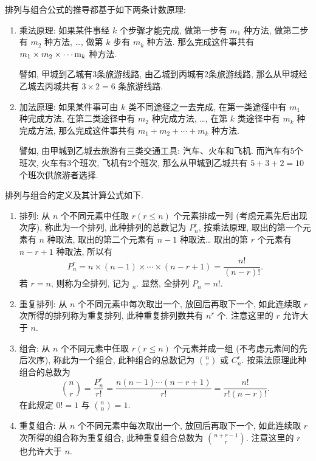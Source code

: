 排列与组合公式的推导都基于如下两条计数原理:
\begin{enumerate}
  \item 乘法原理:
  如果某件事经 $k$ 个步骤才能完成,
  做第一步有 $m_1$ 种方法,
  做第二步有 $m_2$ 种方法,
  \dots,
  做第 $k$ 步有 $m_k$ 种方法.
  那么完成这件事共有 $m_1 \times m_2 \times \dotsb \m_k$ 种方法.

  譬如,
  甲城到乙城有3条旅游线路,
  由乙城到丙城有2条旅游线路,
  那么从甲城经乙城去丙城共有 $3 \times 2 = 6$ 条旅游线路.

  \item 加法原理:
  如果某件事可由 $k$ 类不同途径之一去完成,
  在第一类途径中有 $m_1$ 种完成方法,
  在第二类途径中有 $m_2$ 种完成方法,
  \dots,
  在第 $k$ 类途径中有 $m_k$ 种完成方法,
  那么完成这件事共有 $m_1 + m_2 + \dotsb + m_k$ 种方法.

  譬如,
  由甲城到乙城去旅游有三类交通工具:
  汽车、火车和飞机.
  而汽车有5个班次,
  火车有3个班次,
  飞机有2个班次,
  那么从甲城到乙城共有 $5 + 3 + 2 = 10$ 个班次供旅游者选择.
\end{enumerate}

排列与组合的定义及其计算公式如下.
\begin{enumerate}
  \item 排列:
  从 $n$ 个不同元素中任取 $r (r \le n)$ 个元素排成一列 (考虑元素先后出现次序),
  称此为一个排列,
  此种排列的总数记为 $P_n^r$,
  按乘法原理,
  取出的第一个元素有 $n$ 种取法,
  取出的第二个元素有 $n - 1$ 种取法\dots
  取出的第 $r$ 个元素有 $n - r + 1$ 种取法,
  所以有
  \begin{equation}
    P_n^r = n \times (n - 1) \times \dotsb \times (n - r + 1) = \frac{n!}{(n - r)!}.\label{eq1.2.2}
  \end{equation}
  若 $r = n$,
  则称为全排列,
  记为 $_n$.
  显然,
  全排列 $P_n = n!$.

  \item 重复排列:
  从 $n$ 个不同元素中每次取出一个,
  放回后再取下一个,
  如此连续取 $r$ 次所得的排列称为重复排列,
  此种重复排列数共有 $n^r$ 个.
  注意这里的 $r$ 允许大于 $n$.

  \item 组合:
  从 $n$ 个不同元素中任取 $r (r \le n)$ 个元素并成一组 (不考虑元素间的先后次序),
  称此为一个组合,
  此种组合的总数记为 $\binom{n}{r}$ 或 $C_n^r$.
  按乘法原理此种组合的总数为
  \begin{equation}
    \binom{n}{r} = \frac{P_n^r}{r!} = \frac{n (n - 1) \dotsb (n - r + 1)}{r!} = \frac{n!}{r! (n - r)!}.\label{eq1.2.3}
  \end{equation}
  在此规定 $0! = 1$ 与 $\binom{n}{0} = 1$.

  \item 重复组合:
  从 $n$ 个不同元素中每次取出一个,
  放回后再取下一个,
  如此连续取 $r$ 次所得的组合称为重复组合,
  此种重复组合总数为 $\binom{n + r - 1}{r}$.
  注意这里的 $r$ 也允许大于 $n$.
\end{enumerate}

